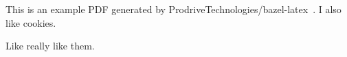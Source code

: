 This is an example PDF generated by ProdriveTechnologies/bazel-latex~\cite{github}.
I also like cookies.

Like really like them.
